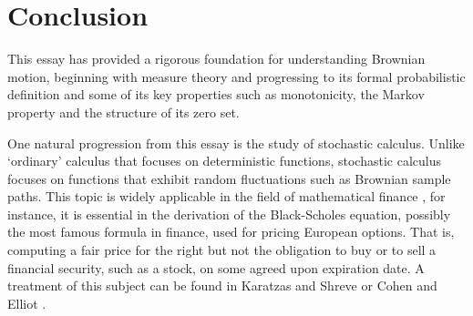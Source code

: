 \documentclass[a4paper,11pt]{article}
\theoremstyle{plain}
\theoremstyle{definition}
\newtheorem{proposition}[theorem]{Proposition}
\begin{document}

\section{Conclusion}

This essay has provided a rigorous foundation for understanding Brownian motion, beginning with measure theory and progressing to its formal probabilistic definition and some of its key properties such as monotonicity, the Markov property and the structure of its zero set. 

One natural progression from this essay is the study of stochastic calculus. Unlike `ordinary' calculus that focuses on deterministic functions, stochastic calculus focuses on functions that exhibit random fluctuations such as Brownian sample paths. This topic is widely applicable in the field of mathematical finance \citep[Preface]{K&R}, for instance, it is essential in the derivation of the Black-Scholes equation, possibly the most famous formula in finance, used for pricing European options. That is, computing a fair price for the right but not the obligation to buy or to sell a financial security, such as a stock, on some agreed upon expiration date. A treatment of this subject can be found in Karatzas and Shreve \citep{IK} or Cohen and Elliot \citep{SC}.


\appendix
\end{document}
